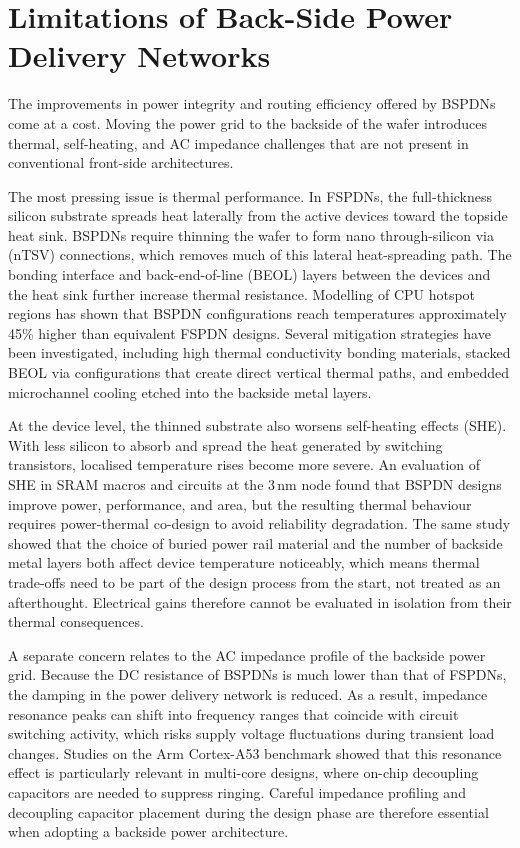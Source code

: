 \section{Limitations of Back-Side Power Delivery Networks}

The improvements in power integrity and routing efficiency offered by BSPDNs come at a cost. Moving the power grid to the backside of the wafer introduces thermal, self-heating, and AC impedance challenges that are not present in conventional front-side architectures.

The most pressing issue is thermal performance. In FSPDNs, the full-thickness silicon substrate spreads heat laterally from the active devices toward the topside heat sink. BSPDNs require thinning the wafer to form nano through-silicon via (nTSV) connections, which removes much of this lateral heat-spreading path. The bonding interface and back-end-of-line (BEOL) layers between the devices and the heat sink further increase thermal resistance. Modelling of CPU hotspot regions has shown that BSPDN configurations reach temperatures approximately 45\% higher than equivalent FSPDN designs\cite{10925422}. Several mitigation strategies have been investigated, including high thermal conductivity bonding materials, stacked BEOL via configurations that create direct vertical thermal paths, and embedded microchannel cooling etched into the backside metal layers\cite{10925422}.

At the device level, the thinned substrate also worsens self-heating effects (SHE). With less silicon to absorb and spread the heat generated by switching transistors, localised temperature rises become more severe. An evaluation of SHE in SRAM macros and circuits at the 3\,nm node found that BSPDN designs improve power, performance, and area, but the resulting thermal behaviour requires power-thermal co-design to avoid reliability degradation\cite{10529350}. The same study showed that the choice of buried power rail material and the number of backside metal layers both affect device temperature noticeably, which means thermal trade-offs need to be part of the design process from the start, not treated as an afterthought\cite{10529350}. Electrical gains therefore cannot be evaluated in isolation from their thermal consequences.

A separate concern relates to the AC impedance profile of the backside power grid. Because the DC resistance of BSPDNs is much lower than that of FSPDNs, the damping in the power delivery network is reduced. As a result, impedance resonance peaks can shift into frequency ranges that coincide with circuit switching activity, which risks supply voltage fluctuations during transient load changes\cite{8993617}. Studies on the Arm Cortex-A53 benchmark showed that this resonance effect is particularly relevant in multi-core designs, where on-chip decoupling capacitors are needed to suppress ringing\cite{8993617}. Careful impedance profiling and decoupling capacitor placement during the design phase are therefore essential when adopting a backside power architecture.

